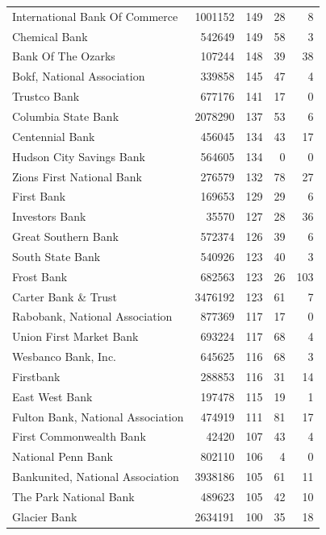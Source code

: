\begin{tabular}{lrrrr}
International Bank Of Commerce & 1001152 & 149 & 28 & 8\\
Chemical Bank & 542649 & 149 & 58 & 3\\
Bank Of The Ozarks & 107244 & 148 & 39 & 38\\
Bokf, National Association & 339858 & 145 & 47 & 4\\
Trustco Bank & 677176 & 141 & 17 & 0\\
Columbia State Bank & 2078290 & 137 & 53 & 6\\
Centennial Bank & 456045 & 134 & 43 & 17\\
Hudson City Savings Bank & 564605 & 134 & 0 & 0\\
Zions First National Bank & 276579 & 132 & 78 & 27\\
First Bank & 169653 & 129 & 29 & 6\\
Investors Bank & 35570 & 127 & 28 & 36\\
Great Southern Bank & 572374 & 126 & 39 & 6\\
South State Bank & 540926 & 123 & 40 & 3\\
Frost  Bank & 682563 & 123 & 26 & 103\\
Carter Bank \& Trust & 3476192 & 123 & 61 & 7\\
Rabobank, National Association & 877369 & 117 & 17 & 0\\
Union First Market Bank & 693224 & 117 & 68 & 4\\
Wesbanco Bank, Inc. & 645625 & 116 & 68 & 3\\
Firstbank & 288853 & 116 & 31 & 14\\
East West Bank & 197478 & 115 & 19 & 1\\
Fulton Bank, National Association & 474919 & 111 & 81 & 17\\
First Commonwealth Bank & 42420 & 107 & 43 & 4\\
National Penn Bank & 802110 & 106 & 4 & 0\\
Bankunited, National Association & 3938186 & 105 & 61 & 11\\
The Park National Bank & 489623 & 105 & 42 & 10\\
Glacier Bank & 2634191 & 100 & 35 & 18\\
\bottomrule
\end{tabular}

